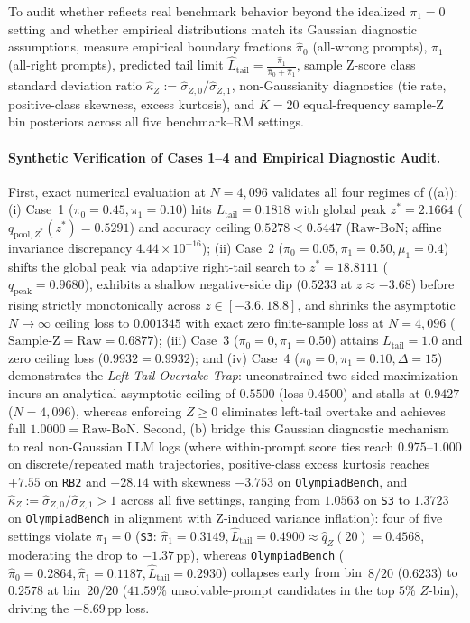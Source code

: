 \documentclass[10pt]{article}
\theoremstyle{plain}
\theoremstyle{definition}
\theoremstyle{remark}
\begin{document}
To audit whether  reflects real benchmark behavior beyond the idealized $\pi_1 = 0$ setting and whether empirical distributions match its Gaussian diagnostic assumptions,  measure empirical boundary fractions $\hat{\pi}_0$ (all-wrong prompts), $\hat{\pi}_1$ (all-right prompts), predicted tail limit $\hat{L}_{\mathrm{tail}} = \frac{\hat{\pi}_1}{\hat{\pi}_0 + \hat{\pi}_1}$, sample Z-score class standard deviation ratio $\hat{\kappa}_Z := \hat{\sigma}_{Z,0}/\hat{\sigma}_{Z,1}$, non-Gaussianity diagnostics (tie rate, positive-class skewness, excess kurtosis), and $K=20$ equal-frequency sample-Z bin posteriors across all five benchmark--RM settings.

\paragraph{Synthetic Verification of Cases 1--4 and Empirical Diagnostic Audit.}
First, exact numerical evaluation at $N=4{,}096$ validates all four regimes of  ((a)): (i) Case~1 ($\pi_0=0.45, \pi_1=0.10$) hits $L_{\mathrm{tail}}=0.1818$ with global peak $z^*=2.1664$ ($q_{\mathrm{pool},Z^*}(z^*)=0.5291$) and accuracy ceiling $0.5278 < 0.5447$ ($\mathrm{Raw\text{-}BoN}$; affine invariance discrepancy $4.44\times 10^{-16}$); (ii) Case~2 ($\pi_0=0.05, \pi_1=0.50, \mu_1=0.4$) shifts the global peak via adaptive right-tail search to $z^*=18.8111$ ($q_{\mathrm{peak}}=0.9680$), exhibits a shallow negative-side dip ($0.5233$ at $z \approx -3.68$) before rising strictly monotonically across $z \in [-3.6, 18.8]$, and shrinks the asymptotic $N\to\infty$ ceiling loss to $0.001345$ with exact zero finite-sample loss at $N=4{,}096$ ($\mathrm{Sample\text{-}Z} = \mathrm{Raw} = 0.6877$); (iii) Case~3 ($\pi_0=0, \pi_1=0.50$) attains $L_{\mathrm{tail}}=1.0$ and zero ceiling loss ($0.9932 = 0.9932$); and (iv) Case~4 ($\pi_0=0, \pi_1=0.10, \Delta=15$) demonstrates the \emph{Left-Tail Overtake Trap}: unconstrained two-sided maximization incurs an analytical asymptotic ceiling of $0.5500$ (loss $0.4500$) and stalls at $0.9427$ ($N=4{,}096$), whereas enforcing $Z \ge 0$ eliminates left-tail overtake and achieves full $1.0000 = \mathrm{Raw\text{-}BoN}$. Second, (b) bridge this Gaussian diagnostic mechanism to real non-Gaussian LLM logs (where within-prompt score ties reach $0.975$--$1.000$ on discrete/repeated math trajectories, positive-class excess kurtosis reaches $+7.55$ on \texttt{RB2} and $+28.14$ with skewness $-3.753$ on \texttt{OlympiadBench}, and $\hat{\kappa}_Z := \hat{\sigma}_{Z,0}/\hat{\sigma}_{Z,1} > 1$ across all five settings, ranging from $1.0563$ on \texttt{S3} to $1.3723$ on \texttt{OlympiadBench} in alignment with Z-induced variance inflation): four of five settings violate $\pi_1=0$ (\texttt{S3}: $\hat{\pi}_1=0.3149, \hat{L}_{\mathrm{tail}}=0.4900 \approx \hat{q}_Z(20)=0.4568$, moderating the drop to $-1.37\,\mathrm{pp}$), whereas \texttt{OlympiadBench} ($\hat{\pi}_0=0.2864, \hat{\pi}_1=0.1187, \hat{L}_{\mathrm{tail}}=0.2930$) collapses early from bin~$8/20$ ($0.6233$) to $0.2578$ at bin~$20/20$ ($41.59\%$ unsolvable-prompt candidates in the top $5\%$ $Z$-bin), driving the $-8.69\,\mathrm{pp}$ loss.
\end{document}
